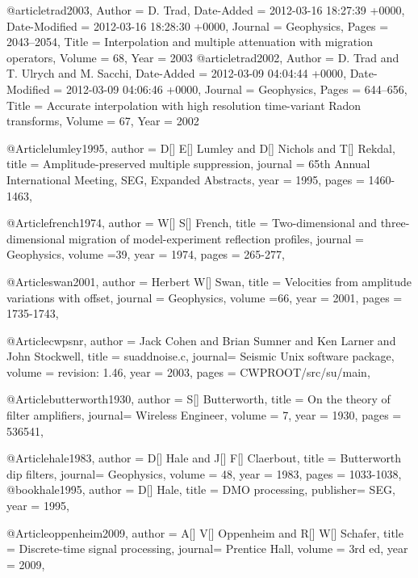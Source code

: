 @article{trad2003,
	Author = {D. Trad},
	Date-Added = {2012-03-16 18:27:39 +0000},
	Date-Modified = {2012-03-16 18:28:30 +0000},
	Journal = {Geophysics},
	Pages = {2043--2054},
	Title = {Interpolation and multiple attenuation with migration operators},
	Volume = {68},
	Year = {2003}}
@article{trad2002,
	Author = {D. Trad and T. Ulrych and M. Sacchi},
	Date-Added = {2012-03-09 04:04:44 +0000},
	Date-Modified = {2012-03-09 04:06:46 +0000},
	Journal = {Geophysics},
	Pages = {644--656},
	Title = {Accurate interpolation with high resolution time-variant {R}adon transforms},
	Volume = {67},
	Year = {2002}}

@Article{lumley1995,
  author = 	 {D[] E[] Lumley and D[] Nichols and T[] Rekdal},
  title = 	 {Amplitude-preserved multiple suppression},
  journal = 	 {65th Annual International Meeting, SEG, Expanded Abstracts},
  year = 	 1995,
  pages =	 {1460-1463},
}

@Article{french1974,
  author = 	 {W[] S[] French},
  title = 	 {Two-dimensional and three-dimensional migration of model-experiment reflection profiles},
  journal = 	 {Geophysics},
  volume ={39},
  year = 	 1974,
  pages =	 {265-277},
}

@Article{swan2001,
  author = 	 {Herbert W[] Swan},
  title = 	 {Velocities from amplitude variations with offset},
  journal = 	 {Geophysics},
  volume ={66},
  year = 	 2001,
  pages =	 {1735-1743},
}

@Article{cwpsnr,
  author = 	 {Jack Cohen and Brian Sumner and Ken Larner and John Stockwell},
  title  = 	 {suaddnoise.c},
  journal= 	 {Seismic Unix software package},
  volume =	 {revision: 1.46},
  year   = 	 2003,
  pages  =	 {CWPROOT/src/su/main},
}

@Article{butterworth1930,
  author = 	 {S[] Butterworth},
  title  = 	 {On the theory of filter amplifiers},
  journal= 	 {Wireless Engineer},
  volume =	 {7},
  year   = 	 1930,
  pages  =	 {536541},
}

@Article{hale1983,
  author = 	 {D[] Hale and J[] F[] Claerbout},
  title  = 	 {Butterworth dip filters},
  journal= 	 {Geophysics},
  volume =	 {48},
  year   = 	 1983,
  pages  =	 {1033-1038},
}
@book{hale1995,
  author = 	 {D[] Hale},
  title  = 	 {DMO processing},
  publisher= 	 {SEG},
  year   = 	 1995,
}

@Article{oppenheim2009,
  author = 	 {A[] V[] Oppenheim and R[] W[] Schafer},
  title  = 	 {Discrete-time signal processing},
  journal= 	 {Prentice Hall},
  volume =	 {3rd ed},
  year   = 	 2009,
}

